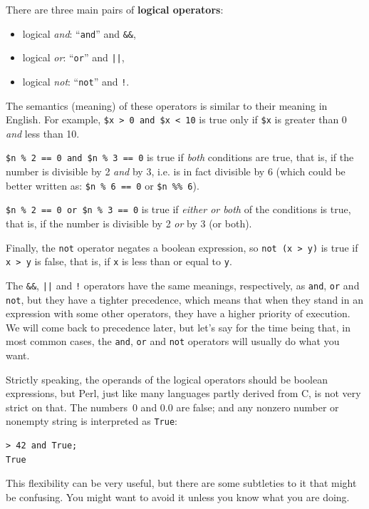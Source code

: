 There are three main pairs of {\bf logical operators}: 
\begin{itemize}
\item logical \emph{and}: ``{\tt and}'' and {\tt \&\&}, 
\item logical \emph{or}: ``{\tt or}'' and {\tt ||}, 
\item logical \emph{not}: ``{\tt not}'' and {\tt !}.
\end{itemize}

The semantics (meaning) of these operators is
similar to their meaning in English.  For example,
{\tt \$x > 0 and \$x < 10} is true only if {\tt \$x} is greater 
than 0 {\em and} less than 10.

{\tt \$n \% 2 == 0 and \$n \% 3 == 0} is true if {\em both} 
conditions are true, that is, if the number is divisible by 2
{\em and} by 3, i.e. is in fact divisible by 6 (which could be better 
written as: {\tt \$n \% 6 == 0} or {\tt \$n \%\% 6}).

{\tt \$n \% 2 == 0 or \$n \% 3 == 0} is true if {\em either or 
both} of the conditions is true, that is, if the number is 
divisible by 2 {\em or} by 3 (or both).

Finally, the {\tt not} operator negates a boolean
expression, so {\tt not (x > y)} is true if {\tt x > y} 
is false, that is, if {\tt x} is less than or equal 
to {\tt y}.

The {\tt \&\&}, {\tt ||} and {\tt !} operators have the same 
meanings, respectively, as {\tt and}, {\tt or} and {\tt not}, 
but they have a tighter precedence, which means that when 
they stand in an expression with some other operators, 
they have a higher priority of execution. We will come 
back to precedence later, but let's say for the time being 
that, in most common cases, the {\tt and}, {\tt or} and 
{\tt not} operators will usually do what you want.

Strictly speaking, the operands of the logical operators should 
be boolean expressions, but Perl, just like many languages 
partly derived from C, is not very strict on that. The 
numbers~0 and 0.0 are false; and any nonzero number 
or nonempty string is interpreted as {\tt True}:

\begin{verbatim}
> 42 and True;
True
\end{verbatim}
%
This flexibility can be very useful, but there are some 
subtleties to it that might be confusing.  You might want 
to avoid it unless you know what you are doing.

